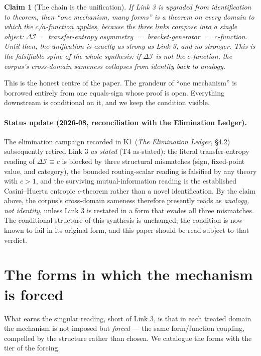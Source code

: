 \documentclass[11pt,a4paper]{article}
\newcommand{\dI}{\Delta\mathcal{I}}
\newcommand{\Tf}{\textsf{T4}}
\newcommand{\paper}[1]{\textsf{#1}}
\theoremstyle{definition}
\theoremstyle{plain}
\newtheorem{claim}{Claim}
\begin{document}
\begin{claim}[The chain is the unification]
If Link 3 is upgraded from identification to theorem, then ``one mechanism, many forms'' is a
theorem on every domain to which the $c$/$a$-function applies, because the three links compose into
a single object: $\dI = $ transfer-entropy asymmetry $=$ bracket-generator $=$ $c$-function. Until
then, the unification is exactly as strong as Link 3, and no stronger. This is the falsifiable spine
of the whole synthesis: if $\dI$ is \emph{not} the $c$-function, the corpus's cross-domain sameness
collapses from identity back to analogy.
\end{claim}

This is the honest centre of the paper. The grandeur of ``one mechanism'' is borrowed entirely from
one equals-sign whose proof is open. Everything downstream is conditional on it, and we keep the
condition visible.

\paragraph{Status update (2026-08, reconciliation with the Elimination Ledger).}
The elimination campaign recorded in \paper{K1} (\emph{The Elimination Ledger},
\S4.2) subsequently retired Link 3 \emph{as stated} (\Tf{} as-stated): the literal
transfer-entropy reading of $\dI \equiv c$ is blocked by three structural mismatches
(sign, fixed-point value, and category), the bounded routing-scalar reading is
falsified by any theory with $c > 1$, and the surviving mutual-information reading is
the established Casini--Huerta entropic $c$-theorem rather than a novel
identification. By the claim above, the corpus's cross-domain sameness therefore
presently reads as \emph{analogy, not identity}, unless Link 3 is restated in a form
that evades all three mismatches. The conditional structure of this synthesis is
unchanged; the condition is now known to fail in its original form, and this paper
should be read subject to that verdict.

\section{The forms in which the mechanism is forced}\label{sec:forms}

What earns the singular reading, short of Link 3, is that in each treated domain the mechanism is not
imposed but \emph{forced} --- the same form/function coupling, compelled by the structure rather than
chosen. We catalogue the forms with the tier of the forcing.
\end{document}

